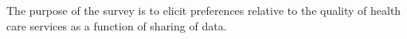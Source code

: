                      

The purpose of the survey is to elicit preferences relative to the quality of health care services as a function of sharing of data. 